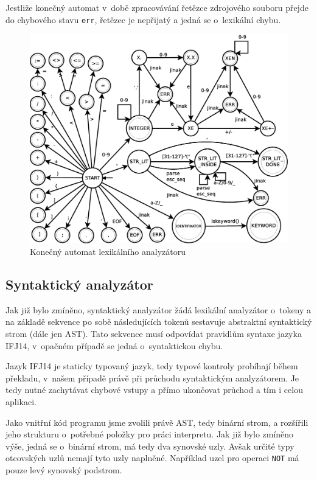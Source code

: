 \documentclass[12pt,a4paper,titlepage,final]{article}
\begin{document}
Jestliže konečný automat v~době zpracovávání řetězce zdrojového souboru
přejde do chybového stavu \verb|err|, řetězec je nepřijatý a jedná se
o~lexikální chybu. 

\begin{figure}[h!]
	\centering
		\includegraphics[width=\textwidth]{img/KA-scanner.eps}
	\caption{Konečný automat lexikálního analyzátoru}
	\label{fig:lex_ka}
\end{figure}
\pagebreak

\subsection{Syntaktický analyzátor} \label{syntakticky_analyzator}
Jak již bylo zmíněno, syntaktický analyzátor žádá lexikální analyzátor o~tokeny
a na základě sekvence po sobě následujících tokenů sestavuje abstraktní syntaktický
strom (dále jen AST). Tato sekvence musí odpovídat pravidlům syntaxe jazyka IFJ14,
v~opačném případě se jedná o~syntaktickou chybu.

Jazyk IFJ14 je staticky typovaný jazyk, tedy typové kontroly probíhají během 
překladu, v~našem případě právě při průchodu syntaktickým analyzátorem. Je tedy
nutné zachytávat chybové vstupy a přímo ukončovat průchod a tím i celou aplikaci.

Jako vnitřní kód programu jsme zvolili právě AST, tedy binární strom, a rozšířili
jeho strukturu o~potřebné položky pro práci interpretu. Jak již bylo zmíněno výše,
jedná se o~binární strom, má tedy dva synovské uzly. Avšak určité typy otcovských uzlů
nemají tyto uzly naplněné. Například uzel pro operaci \verb|NOT| má pouze levý synovský podstrom.
\end{document}
